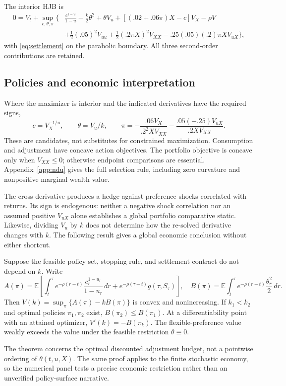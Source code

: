 The interior HJB is
\begin{align}
0=V_t+\sup_{c,\theta,\pi}\bigg\{&\frac{c^{1-u}}{1-u}-\frac{k}{2}\theta^2
+\theta V_u+[(.02+.06\pi)X-c]V_X-\rho V\nonumber\\
&+\tfrac12(.05)^2V_{uu}+\tfrac12(.2\pi X)^2V_{XX}
-.25(.05)(.2)\pi X V_{uX}\bigg\},\label{eq:ndu-hjb}
\end{align}
with \eqref{eq:settlement} on the parabolic boundary. All three second-order contributions are retained.

\subsection{Policies and economic interpretation}
Where the maximizer is interior and the indicated derivatives have the required signs,
\begin{equation}
c=V_X^{-1/u},\qquad \theta=V_u/k,\qquad
\pi=-\frac{.06V_X}{.2^2XV_{XX}}-
\frac{.05(-.25)V_{uX}}{.2XV_{XX}}.
\label{eq:foc}
\end{equation}
These are candidates, not substitutes for constrained maximization. Consumption and adjustment have concave action objectives. The portfolio objective is concave only when $V_{XX}\leq0$; otherwise endpoint comparisons are essential. Appendix~\ref{app:ndu} gives the full selection rule, including zero curvature and nonpositive marginal wealth value.

The cross derivative produces a hedge against preference shocks correlated with returns. Its sign is endogenous: neither a negative shock correlation nor an assumed positive $V_{uX}$ alone establishes a global portfolio comparative static. Likewise, dividing $V_u$ by $k$ does not determine how the re-solved derivative changes with $k$. The following result gives a global economic conclusion without either shortcut.

\begin{theorem}\label{thm:cost}
Suppose the feasible policy set, stopping rule, and settlement contract do not depend on $k$. Write
\[
A(\pi)=\mathbb E\left[\int_t^\tau e^{-\rho(r-t)}\frac{c_r^{1-u_r}}{1-u_r}\,dr
+e^{-\rho(\tau-t)}g(\tau,S_\tau)\right],
\quad B(\pi)=\mathbb E\int_t^\tau e^{-\rho(r-t)}\frac{\theta_r^2}{2}\,dr.
\]
Then $V(k)=\sup_\pi\{A(\pi)-kB(\pi)\}$ is convex and nonincreasing. If $k_1<k_2$ and optimal policies $\pi_1,\pi_2$ exist, $B(\pi_2)\leq B(\pi_1)$. At a differentiability point with an attained optimizer, $V'(k)=-B(\pi_k)$. The flexible-preference value weakly exceeds the value under the feasible restriction $\theta\equiv0$.
\end{theorem}
The theorem concerns the optimal discounted adjustment budget, not a pointwise ordering of $\theta(t,u,X)$. The same proof applies to the finite stochastic economy, so the numerical panel tests a precise economic restriction rather than an unverified policy-surface narrative.

